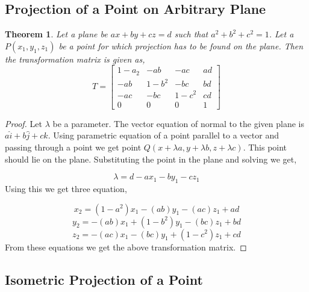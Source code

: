 \documentclass[12pt]{article}
\newtheorem{theorem}{Theorem}
\begin{document}
\subsection{Projection of a Point on Arbitrary Plane}
	\begin{theorem}
	Let a plane be $ax+by+cz=d$ such that $a^2+b^2+c^2 = 1$. Let a $P(x_1,y_1,z_1)$ be a point for which projection has to be found on the plane. Then the transformation matrix is given as,
	\[
		T = 
		\begin{bmatrix}
		1-a_2 & -ab & -ac & ad\\
		-ab & 1-b^2 & -bc & bd\\
		-ac & -bc & 1-c^2 & cd\\
		0 & 0 & 0 & 1
		\end{bmatrix}			
	\]
	\end{theorem}
	\begin{proof}
		Let $\lambda$ be a parameter. The vector equation of normal to the given plane is $a\hat{i}+b\hat{j}+c\hat{k}$. Using parametric equation of a point parallel to a vector and passing through a point we get point $Q(x+\lambda a, y+\lambda b,z+\lambda c)$. This point should lie on the plane. Substituting the point in the plane and solving we get,
		
			\begin{equation}
				\lambda  = d-ax_1-by_1-cz_1
			\end{equation}
		Using this we get three equation,
		
			\begin{equation}
				x_2 = (1-a^2)x_1 - (ab)y_1 - (ac)z_1 +ad
			\end{equation}
			\begin{equation}
				y_2 = - (ab)x_1 +(1-b^2)y_1  - (bc)z_1 +bd
			\end{equation}
			\begin{equation}
				z_2 =  - (ac)x_1 - (bc)y_1+ (1-c^2)z_1 +cd
			\end{equation}
		From these equations we get the above transformation matrix.
	\end{proof}

\subsection{Isometric Projection of a Point}
\end{document}
